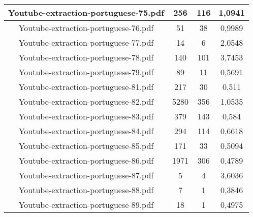 \documentclass[11pt]{article}
\newlength\mylength
\begin{document}
\begin{center}
\begin{longtable}{||C{.40\mylength}||C{.30\mylength}||C{.30\mylength}||C{.30\mylength}||}
  Youtube-extraction-portuguese-75.pdf & 256 & 116 & 1,0941 \\  \hline
  Youtube-extraction-portuguese-76.pdf & 51 & 38 & 0,9989 \\  \hline
  Youtube-extraction-portuguese-77.pdf & 14 & 6 & 2,0548 \\  \hline
  Youtube-extraction-portuguese-78.pdf & 140 & 101 & 3,7453 \\  \hline
  Youtube-extraction-portuguese-79.pdf & 89 & 11 & 0,5691 \\  \hline
  Youtube-extraction-portuguese-81.pdf & 217 & 30 & 0,511 \\  \hline
  Youtube-extraction-portuguese-82.pdf & 5280 & 356 & 1,0535 \\  \hline
  Youtube-extraction-portuguese-83.pdf & 379 & 143 & 0,584 \\  \hline
  Youtube-extraction-portuguese-84.pdf & 294 & 114 & 0,6618 \\  \hline
  Youtube-extraction-portuguese-85.pdf & 171 & 33 & 0,5094 \\  \hline
  Youtube-extraction-portuguese-86.pdf & 1971 & 306 & 0,4789 \\  \hline
  Youtube-extraction-portuguese-87.pdf & 5 & 4 & 3,6036 \\  \hline
  Youtube-extraction-portuguese-88.pdf & 7 & 1 & 0,3846 \\  \hline
  Youtube-extraction-portuguese-89.pdf & 18 & 1 & 0,4975 \\  \hline

\end{longtable}
\end{center}
\end{document}
